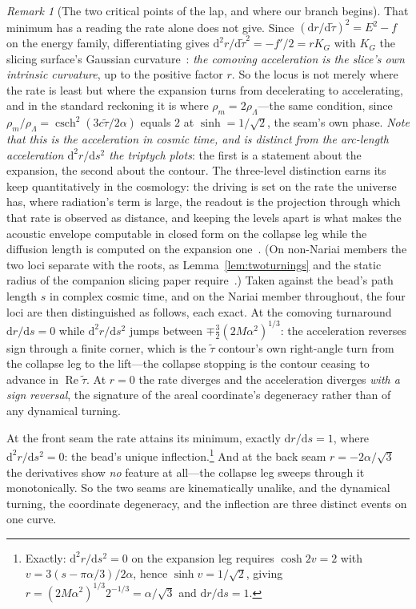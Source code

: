 \documentclass[11pt,a4paper]{article}
\theoremstyle{plain}
\theoremstyle{definition}
\theoremstyle{remark}
\newtheorem{remark}{Remark}
\begin{document}
\begin{remark}[The two critical points of the lap, and where our branch begins]
That minimum has a reading the rate alone does not give. Since $(\mathrm{d}r/\mathrm{d}\tilde\tau)^{2}=E^{2}-f$ on the energy family, differentiating gives $\mathrm{d}^{2}r/\mathrm{d}\tilde\tau^{2}=-f'/2=rK_{G}$ with $K_{G}$ the slicing surface's Gaussian curvature~\cite{JanzenSlicing}: \emph{the comoving acceleration is the slice's own intrinsic curvature}, up to the positive factor $r$. So the locus is not merely where the rate is least but where the expansion turns from decelerating to accelerating, and in the standard reckoning it is where $\rho_{m}=2\rho_{\Lambda}$---the same condition, since $\rho_{m}/\rho_{\Lambda}=\operatorname{csch}^{2}(3c\tilde\tau/2\alpha)$ equals $2$ at $\sinh=1/\sqrt2$, the seam's own phase. \emph{Note that this is the acceleration in cosmic time, and is distinct from the arc-length acceleration $\mathrm{d}^{2}r/\mathrm{d}s^{2}$ the triptych plots}: the first is a statement about the expansion, the second about the contour. The three-level distinction earns its keep quantitatively in the cosmology: the driving is set on the rate the universe has, where radiation's term is large, the readout is the projection through which that rate is observed as distance, and keeping the levels apart is what makes the acoustic envelope computable in closed form on the collapse leg while the diffusion length is computed on the expansion one~\cite{JanzenCRcosmology}. (On non-Nariai members the two loci separate with the roots, as Lemma~\ref{lem:twoturnings} and the static radius of the companion slicing paper require~\cite{JanzenSlicing}.) Taken against the bead's path length $s$ in complex cosmic time, and on the Nariai member throughout, the four loci are then distinguished as follows, each exact. At the comoving turnaround $\mathrm{d}r/\mathrm{d}s=0$ while $\mathrm{d}^2r/\mathrm{d}s^2$ jumps between $\mp\tfrac32(2M\alpha^2)^{1/3}$: the acceleration reverses sign through a finite corner, which is the $\tilde\tau$ contour's own right-angle turn from the collapse leg to the lift---the collapse stopping is the contour ceasing to advance in $\operatorname{Re}\tilde\tau$. At $r=0$ the rate diverges and the acceleration diverges \emph{with a sign reversal}, the signature of the areal coordinate's degeneracy rather than of any dynamical turning.

At the front seam the rate attains its minimum, exactly $\mathrm{d}r/\mathrm{d}s=1$, where $\mathrm{d}^2r/\mathrm{d}s^2=0$: the bead's unique inflection.\footnote{Exactly: $\mathrm{d}^2r/\mathrm{d}s^2=0$ on the expansion leg requires $\cosh 2v=2$ with $v=3(s-\pi\alpha/3)/2\alpha$, hence $\sinh v = 1/\sqrt2$, giving $r=(2M\alpha^2)^{1/3}2^{-1/3}=\alpha/\sqrt3$ and $\mathrm{d}r/\mathrm{d}s=1$.} And at the back seam $r=-2\alpha/\sqrt3$ the derivatives show \emph{no} feature at all---the collapse leg sweeps through it monotonically. So the two seams are kinematically unalike, and the dynamical turning, the coordinate degeneracy, and the inflection are three distinct events on one curve.


\end{remark}
\end{document}

